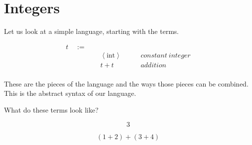 
\section{Integers}

\begin{frame}[c]
  \begin{center}
    Let us look at a simple language, starting with the terms.
  \end{center}
\end{frame}

\begin{frame}
\begin{mdframed}[frametitle={Terms}]
\begin{displaymath}
    \begin{aligned}
t \quad:=\quad& ~ &\\
  & ~ \left<\text{int}\right> \quad\quad &constant~integer\\
  & ~ t + t \quad\quad &addition\\
    \end{aligned}
  \end{displaymath}
\end{mdframed}

  \medskip

\begin{overprint}
\onslide<+>
These are the pieces of the language and the ways those pieces can be combined.
\onslide<+>
This is the abstract syntax of our language.
\end{overprint}
\end{frame}

\begin{frame}[c]
    What do these terms look like?
\end{frame}

\begin{frame}
\begin{displaymath}
  3 
\end{displaymath}
\end{frame}

\begin{frame}
\begin{displaymath}
  (1 + 2) + (3 + 4)
\end{displaymath}
\end{frame}

